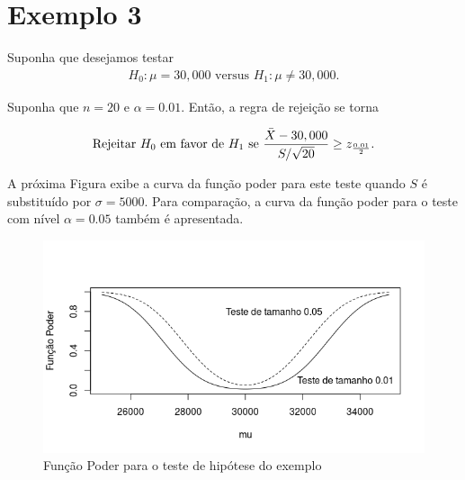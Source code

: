 \documentclass[12pt]{beamer}
\begin{document}
\section{Exemplo 3}
\begin{frame}{}
\begin{block}{}
\justifying
Suponha que desejamos testar
\begin{align}
H_0 : \mu = 30,000 \text{ versus } H_1 : \mu \neq 30,000. 
\end{align}

Suponha que $n = 20$ e $\alpha = 0.01$. Então, a regra de rejeição se torna

\begin{align}
\text{Rejeitar } H_0 \text{ em favor de } H_1 \text{ se } \frac{\Bar{X} - 30,000}{S/\sqrt{20}} \geq z_{\frac{0.01}{2}}.
\end{align}

A próxima Figura exibe a curva da função poder para este teste quando $S$ é substituído por $\sigma = 5000$. Para comparação, a curva da função poder para o teste com nível $\alpha = 0.05$ também é apresentada. 
\end{block}
\end{frame}


\begin{frame}{}
\begin{block}{}
\justifying
\begin{figure}
    \centering
    \includegraphics[scale=0.6]{figs/FunctionPower.png}
    \caption{Função Poder para o teste de hipótese do exemplo}
    \label{fig:enter-label}
\end{figure}
\end{block}
\end{frame}
\end{document}
